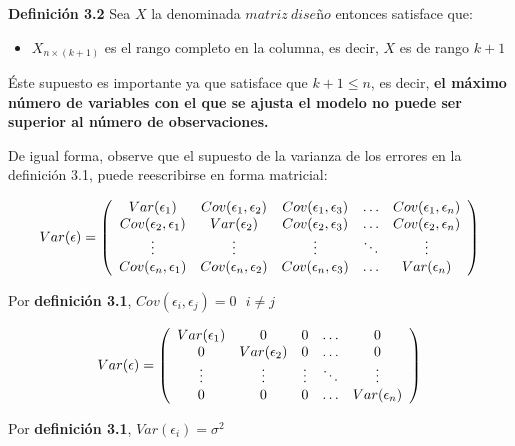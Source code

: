 \documentclass[a4paper,oneside,openany]{book}
\providecommand{\tightlist}{%
  \setlength{\itemsep}{0pt}\setlength{\parskip}{0pt}}
\begin{document}
\textbf{Definición 3.2} Sea \(X\) la denominada \(matriz \ diseño\)
entonces satisface que:

\begin{itemize}
\tightlist
\item
  \(X_{n \times (k+1)}\) es el rango completo en la columna, es decir,
  \(X\) es de rango \(k+1\)
\end{itemize}

Éste supuesto es importante ya que satisface que \(k+1\leq n\), es
decir, \textbf{el máximo número de variables con el que se ajusta el
modelo no puede ser superior al número de observaciones.}

De igual forma, observe que el supuesto de la varianza de los errores en
la definición 3.1, puede reescribirse en forma matricial:

\[
\begin{equation*}
Var(\epsilon)=
\left(
\begin{array}{c c c c c}
Var(\epsilon_{1}) & Cov(\epsilon_{1},\epsilon_{2}) & Cov(\epsilon_{1},\epsilon_{3}) & \ldots & Cov(\epsilon_{1},\epsilon_{ n})\\ 
Cov(\epsilon_{2},\epsilon_{1})&Var(\epsilon_{2}) & Cov(\epsilon_{2},\epsilon_{3}) & \ldots &Cov(\epsilon_{2},\epsilon_{n}) \\
\vdots & \vdots & \vdots & \ddots & \vdots\\
Cov(\epsilon_{n},\epsilon_{1})   & Cov(\epsilon_{n},\epsilon_{2}) & Cov(\epsilon_{n},\epsilon_{3}) & \ldots & Var(\epsilon_{n})\\
\end{array}
\right)
\end{equation*}
\]

Por \textbf{definición 3.1},
\(Cov(\epsilon_{i},\epsilon_{j})=0 \ \ \ i\neq j\)

\[
\begin{equation*}
Var(\epsilon)=
\left(
\begin{array}{c c c c c}
Var(\epsilon_{1}) & 0 & 0 & \ldots & 0 \\ 
0&Var(\epsilon_{2}) & 0 & \ldots & 0 \\
\vdots & \vdots & \vdots & \ddots & \vdots\\
0 & 0 & 0 & \ldots & Var(\epsilon_{n})\\
\end{array}
\right)
\end{equation*}
\]

Por \textbf{definición 3.1}, \(Var(\epsilon_{i})=\sigma^2\)
\end{document}
